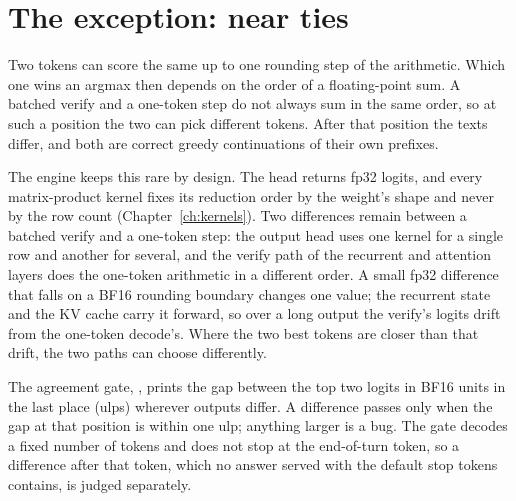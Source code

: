 \section{The exception: near ties}

Two tokens can score the same up to one rounding step of the arithmetic. Which one wins an argmax then depends on the order of a floating-point sum. A batched verify and a one-token step do not always sum in the same order, so at such a position the two can pick different tokens. After that position the texts differ, and both are correct greedy continuations of their own prefixes.

The engine keeps this rare by design. The head returns fp32 logits, and every matrix-product kernel fixes its reduction order by the weight's shape and never by the row count (Chapter~\ref{ch:kernels}). Two differences remain between a batched verify and a one-token step: the output head uses one kernel for a single row and another for several, and the verify path of the recurrent and attention layers does the one-token arithmetic in a different order. A small fp32 difference that falls on a BF16 rounding boundary changes one value; the recurrent state and the KV cache carry it forward, so over a long output the verify's logits drift from the one-token decode's. Where the two best tokens are closer than that drift, the two paths can choose differently.

The agreement gate, , prints the gap between the top two logits in BF16 units in the last place (ulps) wherever outputs differ. A difference passes only when the gap at that position is within one ulp; anything larger is a bug. The gate decodes a fixed number of tokens and does not stop at the end-of-turn token, so a difference after that token, which no answer served with the default stop tokens contains, is judged separately.

